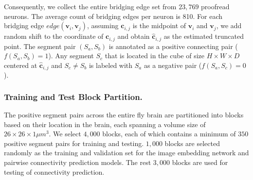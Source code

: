 Consequently, we collect the entire bridging edge set from $23,769$ proofread neurons.
The average count of bridging edges per neuron is 810. 
%
For each bridging edge $edge(\mathbf{v}_i, \mathbf{v}_j)$, assuming ${\mathbf{c}}_{i,j}$ is the midpoint of $\mathbf{v}_i$ and $\mathbf{v}_j$, we add random shift to the coordinate of ${\mathbf{c}}_{i,j}$ and obtain ${\hat{\mathbf{c}}}_{i,j}$ as the estimated truncated point. 
The segment pair $(S_a, S_b)$ is annotated as a positive connecting pair ($f(S_a, S_b)=1$).
Any segment $S_c$ that is located in the cube of size $H\times W\times D$ centered at ${\hat{\mathbf{c}}}_{i,j}$ and $S_c \neq S_b$ is labeled with $S_a$ as a negative pair ($f(S_a, S_c)=0$). 


 \subsubsection{Training and Test Block Partition.}
The positive segment pairs across the entire fly brain are partitioned into blocks based on their location in the brain, each spanning a volume size of $26\times 26\times 1\mu m^3$. We select $4,000$ blocks, each of which contains a minimum of $350$ positive segment pairs for training and testing. 
 $1,000$ blocks are selected randomly as the training and validation set for the image embedding network and pairwise connectivity prediction models. The rest $3,000$ blocks are used for testing of connectivity prediction.
 
 